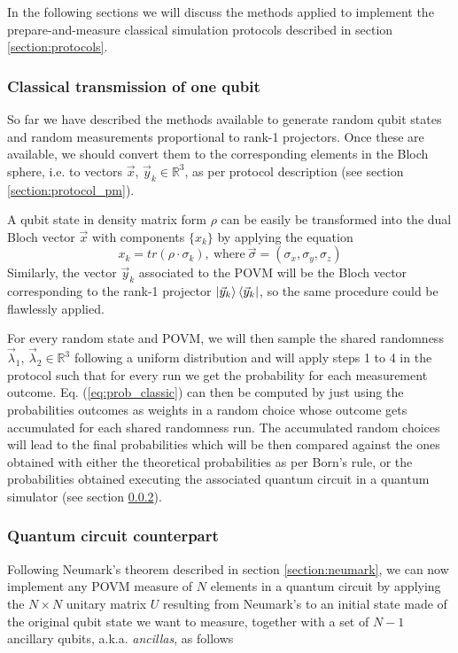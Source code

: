 In the following sections we will discuss the methods applied to implement the prepare-and-measure classical simulation protocols described in section \ref{section:protocols}.
\subsubsection{Classical transmission of one qubit}
So far we have described the methods available to generate random qubit states and random measurements proportional to rank-1 projectors. Once these are available, we should convert them to the corresponding elements in the Bloch sphere, i.e. to vectors $\vec{x}$, ${\vec{y}_k} \in \mathbb{R}^3$, as per protocol description (see section \ref{section:protocol_pm}). 

A qubit state in density matrix form $\rho$ can be easily be transformed into the dual Bloch vector $\vec{x}$ with components $\{x_k\}$ by applying the equation
\begin{equation}
    x_k = tr(\rho \cdot \sigma_k),\ \text{where}\ \vec{\sigma} = (\sigma_x, \sigma_y, \sigma_z)
\end{equation}
Similarly, the vector ${\vec{y}_k}$ associated to the POVM will be the Bloch vector corresponding to the rank-1 projector $ \ket{\vec{y}_k} \bra{\vec{y}_k}$, so the same procedure could be flawlessly applied.

For every random state and POVM, we will then sample the shared randomness $\vec{\lambda}_1$, $\vec{\lambda}_2 \in \mathbb{R}^3$ following a uniform distribution and will apply steps 1 to 4 in the protocol such that for every run we get the probability for each measurement outcome. Eq. (\ref{eq:prob_classic}) can then be computed by just using the probabilities outcomes as weights in a random choice whose outcome gets accumulated for each shared randomness run. The accumulated random choices will lead to the final probabilities which will be then compared against the ones obtained with either the theoretical probabilities as per Born's rule, or the probabilities obtained executing the associated quantum circuit in a quantum simulator (see section \ref{section:quantum_circuit}).

\subsubsection{Quantum circuit counterpart}\label{section:quantum_circuit}
Following Neumark's theorem described in section \ref{section:neumark}, we can now implement any POVM measure of $N$ elements in a quantum circuit by applying the $N\times N$ unitary matrix $U$ resulting from Neumark's to an initial state made of the original qubit state we want to measure, together with a set of $N-1$ ancillary qubits, a.k.a. \textit{ancillas}, as follows  

